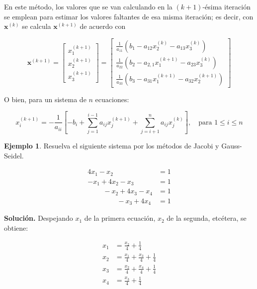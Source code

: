 \documentclass[12pt,letterpaper]{article}
\theoremstyle{definition}
\newtheorem{ejemplo}{Ejemplo}[section]
\theoremstyle{plain}
\theoremstyle{remark}
\begin{document}
En este método, los valores que se van calculando en la $(k+1)$-ésima iteración se emplean para estimar los valores faltantes de esa misma iteración; es decir, con $\mathbf{x}^{(k)}$ se calcula $\mathbf{x}^{(k+1)}$ de acuerdo con

\begin{equation}
\mathbf{x}^{(k+1)} = 
\begin{bmatrix}
x_1^{(k+1)} \\
x_2^{(k+1)} \\
x_3^{(k+1)}
\end{bmatrix}
=
\begin{bmatrix}
\frac{1}{a_{11}} (b_1 - a_{12} x_2^{(k)} - a_{13} x_3^{(k)}) \\
\frac{1}{a_{22}} (b_2 - a_{2,1} x_1^{(k+1)} - a_{23} x_3^{(k)}) \\
\frac{1}{a_{33}} (b_3 - a_{31} x_1^{(k+1)} - a_{32} x_2^{(k+1)})
\end{bmatrix}
\label{eq:3.91}
\tag{11}
\end{equation}

O bien, para un sistema de $n$ ecuaciones:

\begin{equation}
x_i^{(k+1)} = -\frac{1}{a_{ii}} \left[ -b_i + \sum_{j=1}^{i-1} a_{ij} x_j^{(k+1)} + \sum_{j=i+1}^{n} a_{ij} x_j^{(k)} \right], \quad \text{para } 1 \leq i \leq n
\label{eq:3.92}
\tag{12}
\end{equation}

\begin{ejemplo}
Resuelva el siguiente sistema por los métodos de Jacobi y Gauss-Seidel.

\begin{equation}
\begin{aligned}
4x_1 - x_2 &= 1 \\
-x_1 + 4x_2 - x_3 &= 1 \\
\quad\quad\ -x_2 + 4x_3 - x_4 &= 1 \\
\quad\quad\quad\quad\ -x_3 + 4x_4 &= 1
\end{aligned}
\label{eq:3.93}
\tag{13}
\end{equation}
\end{ejemplo}

\textbf{Solución.} Despejando $x_1$ de la primera ecuación, $x_2$ de la segunda, etcétera, se obtiene:

\begin{equation}
\begin{aligned}
x_1 &= \frac{x_2}{4} + \frac{1}{4} \\
x_2 &= \frac{x_1}{4} + \frac{x_3}{4} + \frac{1}{4} \\
x_3 &= \frac{x_2}{4} + \frac{x_4}{4} + \frac{1}{4} \\
x_4 &= \frac{x_3}{4} + \frac{1}{4}
\end{aligned}
\label{eq:3.94}
\tag{14}
\end{equation}
\end{document}
